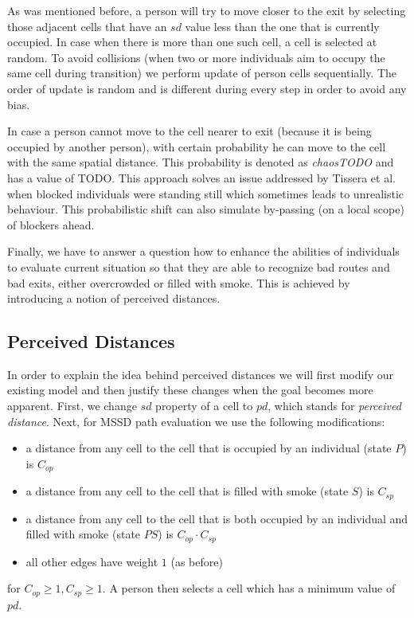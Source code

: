 As was mentioned before, a person will try to move closer to the exit by selecting 
those adjacent cells that have an $sd$ value less than the one that is currently 
occupied.
In case when there is more than one such cell, a cell is selected at random.
To avoid collisions (when two or more individuals aim to occupy the same cell during 
transition) we perform update of person cells sequentially.
The order of update is random and is different during every step in order to avoid 
any bias.

In case a person cannot move to the cell nearer to exit (because it is being 
occupied by another person), with certain probability he can move to the cell with 
the same spatial distance.
This probability is denoted as \emph{chaosTODO} and has a value of TODO.
This approach solves an issue addressed by Tissera et al.~\cite{Tissera1} when 
blocked individuals were standing still which sometimes leads to unrealistic 
behaviour.
This probabilistic shift can also simulate by-passing (on a local scope) of blockers 
ahead.

Finally, we have to answer a question how to enhance the abilities of individuals to 
evaluate current situation so that they are able to recognize bad routes and bad 
exits, either overcrowded or filled with smoke.
This is achieved by introducing a notion of perceived distances.

\subsection{Perceived Distances}
In order to explain the idea behind perceived distances we will first modify our 
existing model and then justify these changes when the goal becomes more apparent. 
First, we change $sd$ property of a cell to $pd$, which stands for \emph{perceived 
distance}.
Next, for MSSD path evaluation we use the following modifications:

\begin{itemize}
    \item a distance from any cell to the cell that is occupied by an individual (state $P$) is $C_{op}$
    \item a distance from any cell to the cell that is filled with smoke (state $S$) is $C_{sp}$
    \item a distance from any cell to the cell that is both occupied by an individual and filled with smoke (state $PS$) is $C_{op} \cdot C_{sp}$
    \item all other edges have weight $1$ (as before)
\end{itemize}
for $C_{op} \geq 1, C_{sp} \geq 1$.
A person then selects a cell which has a minimum value of $pd$.

